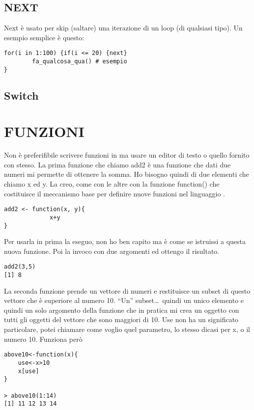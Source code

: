 \subsection{NEXT}

Next è usato per skip (saltare) una iterazione di un loop (di qualsiasi tipo). Un esempio semplice è questo:

\begin{lstlisting}
for(i in 1:100) {if(i <= 20) {next}
		fa_qualcosa_qua() # esempio
}
\end{lstlisting}


\subsection{Switch}




\section{FUNZIONI}

Non è preferifibile scrivere funzioni in \erre ma usare un editor di testo o quello fornito con \erre stesso.	
La prima funzione che chiamo add2 è una funzione che dati due numeri mi permette di ottenere la somma. Ho bisogno quindi di due elementi che chiamo x ed y.  La creo, come con le altre con
la funzione function() che costituisce il meccanismo base per definire nuove funzioni
nel linguaggio \erre.
\begin{lstlisting}
add2 <- function(x, y){
		     x+y
}
\end{lstlisting}
Per usarla in \erre prima la eseguo, non ho ben capito ma è come se istruissi \erre
a questa nuova funzione.
Poi la invoco con due argomenti ed ottengo il risultato.
\begin{lstlisting}
add2(3,5)
[1] 8
\end{lstlisting}

La seconda funzione prende un vettore di numeri e restituisce un subset di questo vettore
che è superiore al numero 10. ``Un'' subset\dots\ quindi un unico elemento e quindi un solo argomento della funzione che in pratica mi crea un oggetto con tutti gli oggetti del  vettore che sono maggiori di 10. Use non ha un significato particolare, potei chiamare
come voglio quel parametro, lo stesso dicasi per x, o il numero 10. Funziona però

\begin{lstlisting}
above10<-function(x){
	use<-x>10
	x[use]
}

> above10(1:14)
[1] 11 12 13 14
\end{lstlisting}

